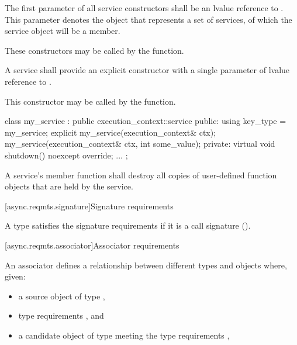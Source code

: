 \pnum
The first parameter of all service constructors shall be an lvalue reference to . This parameter denotes the  object that represents a set of services, of which the service object will be a member. \begin{note} These constructors may be called by the  function. \end{note}

\pnum
A service shall provide an explicit constructor with a single parameter of lvalue reference to . \begin{note} This constructor may be called by the  function. \end{note}

\pnum
\begin{example} 

\begin{codeblock}
class my_service : public execution_context::service
{
public:
  using key_type = my_service;
  explicit my_service(execution_context& ctx);
  my_service(execution_context& ctx, int some_value);
private:
  virtual void shutdown() noexcept override;
  ...
};
\end{codeblock}

\end{example}

\pnum
A service's  member function shall destroy all copies of user-defined function objects that are held by the service.



[async.reqmts.signature]{Signature requirements}

%
%
\pnum
A type satisfies the signature requirements if it is a call signature ().



[async.reqmts.associator]{Associator requirements}

%
%
\pnum
An associator defines a relationship between different types and objects where, given:

\begin{itemize}
\item
a source object  of type ,

\item
type requirements , and

\item
a candidate object  of type  meeting the type requirements ,
\end{itemize}

